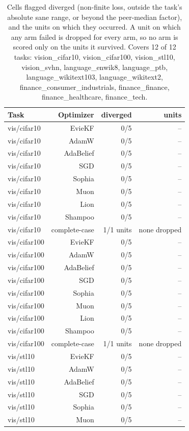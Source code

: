 \begin{table}[t]
\centering
\small
\caption{Cells flagged diverged (non-finite loss, outside the task's absolute sane range, or beyond the peer-median factor), and the units on which they occurred. A unit on which any arm failed is dropped for every arm, so no arm is scored only on the units it survived. Covers 12 of 12 tasks: vision\_cifar10, vision\_cifar100, vision\_stl10, vision\_svhn, language\_enwik8, language\_ptb, language\_wikitext103, language\_wikitext2, finance\_consumer\_industrials, finance\_finance, finance\_healthcare, finance\_tech.}
\label{tab:table9_divergence}
\begin{tabular}{lrrr}
\toprule
Task & Optimizer & diverged & units \\
\midrule
vis/cifar10 & EvieKF & 0/5 & -- \\
vis/cifar10 & AdamW & 0/5 & -- \\
vis/cifar10 & AdaBelief & 0/5 & -- \\
vis/cifar10 & SGD & 0/5 & -- \\
vis/cifar10 & Sophia & 0/5 & -- \\
vis/cifar10 & Muon & 0/5 & -- \\
vis/cifar10 & Lion & 0/5 & -- \\
vis/cifar10 & Shampoo & 0/5 & -- \\
vis/cifar10 & complete-case & 1/1 units & none dropped \\
vis/cifar100 & EvieKF & 0/5 & -- \\
vis/cifar100 & AdamW & 0/5 & -- \\
vis/cifar100 & AdaBelief & 0/5 & -- \\
vis/cifar100 & SGD & 0/5 & -- \\
vis/cifar100 & Sophia & 0/5 & -- \\
vis/cifar100 & Muon & 0/5 & -- \\
vis/cifar100 & Lion & 0/5 & -- \\
vis/cifar100 & Shampoo & 0/5 & -- \\
vis/cifar100 & complete-case & 1/1 units & none dropped \\
vis/stl10 & EvieKF & 0/5 & -- \\
vis/stl10 & AdamW & 0/5 & -- \\
vis/stl10 & AdaBelief & 0/5 & -- \\
vis/stl10 & SGD & 0/5 & -- \\
vis/stl10 & Sophia & 0/5 & -- \\
vis/stl10 & Muon & 0/5 & -- \\

\end{tabular}
\end{table}
